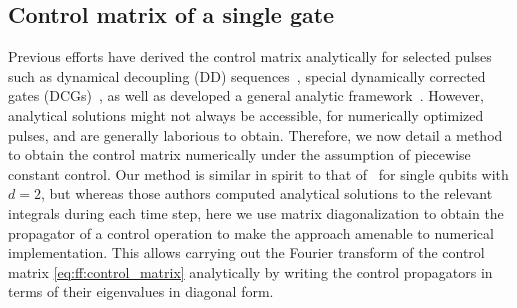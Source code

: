 \subsection{Control matrix of a single gate}\label{sec:ff:theory:control_matrix:pulse}
Previous efforts have derived the control matrix analytically for selected pulses such as dynamical decoupling (DD) sequences~\cite{Cywinski2008}, special dynamically corrected gates (DCGs)~\cite{Gungordu2018}, as well as developed a general analytic framework~\cite{Green2012,Green2013}.
However, analytical solutions might not always be accessible, \eg for numerically optimized pulses, and are generally laborious to obtain.
Therefore, we now detail a method to obtain the control matrix numerically under the assumption of piecewise constant control.
Our method is similar in spirit to that of~\citeauthor{Green2012} for single qubits with $d=2$, but whereas those authors computed analytical solutions to the relevant integrals during each time step, here we use matrix diagonalization to obtain the propagator of a control operation to make the approach amenable to numerical implementation.
This allows carrying out the Fourier transform of the control matrix \cref{eq:ff:control_matrix} analytically by writing the control propagators in terms of their eigenvalues in diagonal form.

